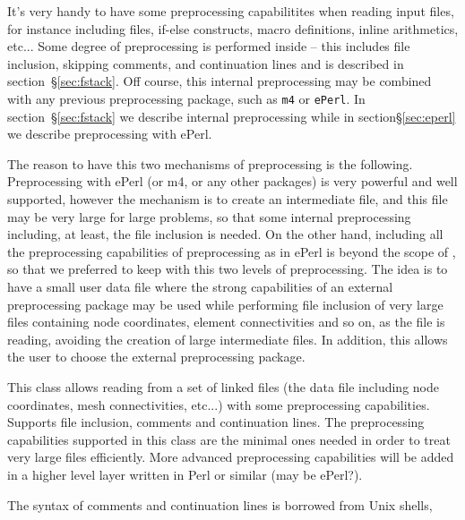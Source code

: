 

%
It's very handy to have some preprocessing capabilitites when reading
input files, for instance including files, if-else constructs, macro
definitions, inline arithmetics, etc... Some degree of preprocessing
is performed inside \pfem{} -- this includes file inclusion, skipping
comments, and continuation lines and is described in
section~\S\ref{sec:fstack}. Off course, this internal preprocessing
may be combined with any previous preprocessing package, such as
\verb+m4+ or \verb+ePerl+. In section~\S\ref{sec:fstack} we describe
internal preprocessing while in section\S\ref{sec:eperl} we describe 
preprocessing with ePerl. 

The reason to have this two mechanisms of preprocessing is the
following. Preprocessing with ePerl (or m4, or any other packages) is
very powerful and well supported, however the mechanism is to create
an intermediate file, and this file may be very large for large
problems, so that some internal preprocessing including, at least, the
file inclusion is needed. On the other hand, including all the
preprocessing capabilities of preprocessing as in ePerl is beyond the
scope of \pfem{}, so that we preferred to keep with this two levels of
preprocessing. The idea is to have a small user data file where the
strong capabilities of an external preprocessing package may be used
while performing file inclusion of very large files containing node
coordinates, element connectivities and so on, as the file is reading,
avoiding the creation of large intermediate files.  In addition, this
allows the user to choose the external preprocessing package.

\label{sec:fstack}  

%
This class allows reading from a set of linked files (the \pfem{}
data file including node coordinates, mesh connectivities, etc...)
with some preprocessing capabilities. Supports file inclusion,
comments and continuation lines. The preprocessing capabilities
supported in this class are the minimal ones needed in order to treat
very large files efficiently. More advanced preprocessing capabilities
will be added in a higher level layer written in Perl or similar (may
be ePerl?).


The syntax of comments and continuation lines is borrowed from Unix
shells,

